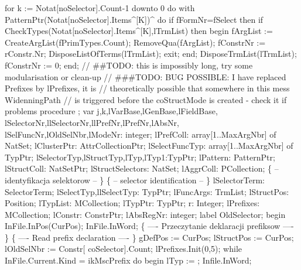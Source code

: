    for k := Notat[noSelector].Count-1 downto 0 do
      with PatternPtr(Notat[noSelector].Items^[K])^ do
         if fFormNr=fSelect then
            if CheckTypes(Notat[noSelector].Items^[K],lTrmList) then
            begin
               fArgList := CreateArgList(fPrimTypes.Count);
               RemoveQua(fArgList);
               fConstrNr := rConstr.Nr;
               DisposeListOfTerms(lTrmList);
               exit;
            end;
   DisposeTrmList(lTrmList);
   fConstrNr := 0;
end;
\eatline
{}\nwendcode{}\nwdocspar
\nwenddocs{}\endmoddef\nwstartdeflinemarkup{}\nwenddeflinemarkup
// ##TODO: this is impossibly long, try some modularisation or clean-up
// ###TODO: BUG POSSIBLE: I have replaced Prefixes by lPrefixes, it is
//          theoretically possible that somewhere in this mess WidenningPath
//          is triggered before the coStructMode is created - check it if problems
procedure ;
var
   j,k,lVarBase,lGenBase,lFieldBase,
   lSelectorNr,llSelectorNr,llPrefNr,lPrefNr,lAbsNr,
   lSelFuncNr,lOldSelNbr,lModeNr: integer;
   lPrefColl: array[1..MaxArgNbr] of NatSet;
   lClusterPtr: AttrCollectionPtr;
   lSelectFuncTyp: array[1..MaxArgNbr] of TypPtr;
   lSelectorTyp,lStructTyp,lTyp,lTyp1:TypPtr;
   lPattern: PatternPtr;
   lStructColl: NatSetPtr;
   lStructSelectors: NatSet;
   lAggrColl: PCollection;
   \{ -- identyfikacja selektorow -- \} \{ -- selector identification -- \}
   lSelectorTerm: SelectorTerm;
   lSelectTyp,llSelectTyp: TypPtr;
   lFuncArgs: TrmList;
   lStructPos: Position;
   lTypList: MCollection;
   lTypPtr: TypPtr;
   r: Integer;
   lPrefixes: MCollection;
   lConstr: ConstrPtr;
   lAbsRegNr: integer;
label OldSelector;
begin
   InFile.InPos(CurPos); InFile.InWord;
   \{ ---- Przeczytanie deklaracji prefiksow ---- \}
   \{ ---- Read prefix declaration ---- \}
   gDefPos := CurPos;
   lStructPos := CurPos;
   lOldSelNbr :=  Constr[ coSelector].Count;
   lPrefixes.Init(0,5);
   while InFile.Current.Kind = ikMscPrefix do
   begin
      lTyp := ; Infile.InWord;
